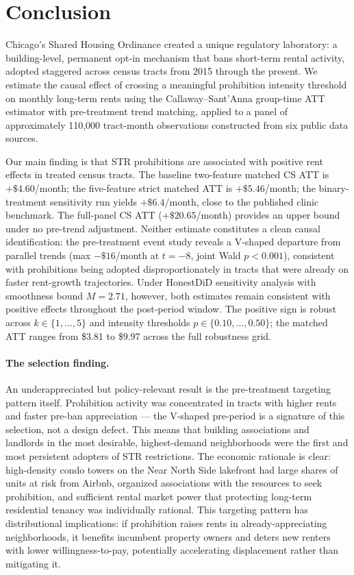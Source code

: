 \section{Conclusion}\label{sec:conclusion}

Chicago's Shared Housing Ordinance created a unique regulatory laboratory: a building-level, permanent opt-in mechanism that bans short-term rental activity, adopted staggered across census tracts from 2015 through the present. We estimate the causal effect of crossing a meaningful prohibition intensity threshold on monthly long-term rents using the Callaway--Sant'Anna group-time ATT estimator with pre-treatment trend matching, applied to a panel of approximately 110,000 tract-month observations constructed from six public data sources.

Our main finding is that STR prohibitions are associated with positive rent effects in treated census tracts. The baseline two-feature matched CS ATT is $+\$4.60$/month; the five-feature strict matched ATT is $+\$5.46$/month; the binary-treatment sensitivity run yields $+\$6.4$/month, close to the published clinic benchmark. The full-panel CS ATT ($+\$20.65$/month) provides an upper bound under no pre-trend adjustment. Neither estimate constitutes a clean causal identification: the pre-treatment event study reveals a V-shaped departure from parallel trends (max $-\$16$/month at $t = -8$, joint Wald $p < 0.001$), consistent with prohibitions being adopted disproportionately in tracts that were already on faster rent-growth trajectories. Under HonestDiD sensitivity analysis with smoothness bound $M = 2.71$, however, both estimates remain consistent with positive effects throughout the post-period window. The positive sign is robust across $k \in \{1, \ldots, 5\}$ and intensity thresholds $p \in \{0.10, \ldots, 0.50\}$; the matched ATT ranges from \$3.81 to \$9.97 across the full robustness grid.

\paragraph{The selection finding.} An underappreciated but policy-relevant result is the pre-treatment targeting pattern itself. Prohibition activity was concentrated in tracts with higher rents and faster pre-ban appreciation --- the V-shaped pre-period is a signature of this selection, not a design defect. This means that building associations and landlords in the most desirable, highest-demand neighborhoods were the first and most persistent adopters of STR restrictions. The economic rationale is clear: high-density condo towers on the Near North Side lakefront had large shares of units at risk from Airbnb, organized associations with the resources to seek prohibition, and sufficient rental market power that protecting long-term residential tenancy was individually rational. This targeting pattern has distributional implications: if prohibition raises rents in already-appreciating neighborhoods, it benefits incumbent property owners and deters new renters with lower willingness-to-pay, potentially accelerating displacement rather than mitigating it.

